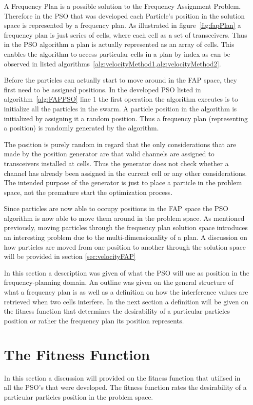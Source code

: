 A Frequency Plan is a possible solution to the Frequency Assignment Problem. Therefore in the PSO that was developed each Particle's position in the solution space is represented by a frequency plan. As illustrated in figure~\ref{fig:fapPlan} a frequency plan is just series of cells, where each cell as a set of transceivers. Thus in the PSO algorithm a plan is actually represented as an array of cells. This enables the algorithm to access particular cells in a plan by index as can be observed in listed algorithms~\ref{alg:velocityMethod1,alg:velocityMethod2}. 

Before the particles can actually start to move around in the FAP space, they first need to be assigned positions. In the developed PSO listed in algorithm~\ref{alg:FAPPSO} line 1 the first operation the algorithm executes is to initialize all the particles in the swarm. A particle position in the algorithm is initialized by assigning it a random position. Thus a frequency plan (representing a position) is randomly generated by the algorithm.

The position is purely random in regard that the only considerations that are made by the position generator are that valid channels are assigned to transceivers installed at cells. Thus the generator does not check whether a channel has already been assigned in the current cell or any other considerations. The intended purpose of the generator is just to place a particle in the problem space, not the premature start the optimization process.

Since particles are now able to occupy positions in the FAP space the PSO algorithm is now able to move them around in the problem space. As mentioned previously, moving particles through the frequency plan solution space introduces an interesting problem due to the multi-dimensionality of a plan. A discussion on how particles are moved from one position to another through the solution space will be provided in section \ref{sec:velocityFAP}

In this section a description was given of what the PSO will use as position in the frequency-planning domain. An outline was given on the general structure of what a frequency plan is as well as a definition on how the interference values are retrieved when two cells interfere. In the next section a definition will be given on the fitness function that determines the desirability of a particular particles position or rather the frequency plan its position represents.
\section{The Fitness Function}
In this section a discussion will provided on the fitness function that utilised in all the PSO's that were developed. The fitness function rates the desirability of a particular particles position in the problem space.

